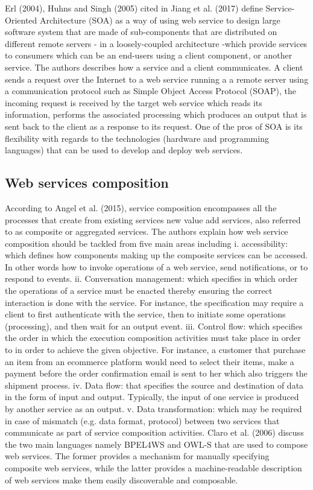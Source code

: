 \documentclass{article}
\begin{document}
Erl (2004), Huhns and Singh (2005) cited in Jiang et al. (2017) define Service-Oriented Architecture (SOA) as a way of using web service to design large software system that are made of sub-components that are distributed on different remote servers -  in a loosely-coupled architecture -which provide services to consumers which can be an end-users using a client component, or another service. The authors describes how a service and a client communicates. A client sends a request over the Internet to a web service running a a remote server using a communication protocol such as Simple Object Access Protocol (SOAP), the incoming request is received by the target web service which reads its information, performs the associated processing which produces an output that is sent back to the client as a response to its request. One of the pros of SOA is its flexibility with regards to the technologies (hardware and programming languages) that can be used to develop and deploy web services.
 
\subsection{Web services composition}
According to Angel et al. (2015), service composition encompasses all the processes that create from existing services new value add services, also referred to as composite or aggregated services. The authors explain how web service composition should be tackled from five main areas including i. accessibility: which defines how components making up the composite services can be accessed. In other words how to invoke operations of a web service, send notifications, or to respond to events. ii. Conversation management: which specifies in which order the operations of a service must be enacted thereby ensuring the correct interaction is done with the service. For instance, the specification may require a client to first authenticate with the service, then to initiate some operations (processing), and then wait for an output event. iii. Control flow: which specifies the order in which the execution composition activities must take place in order to in order to achieve the given objective. For instance, a customer that purchase an item from an ecommerce platform would need to select their items, make a payment before the order confirmation email is sent to her which also triggers the shipment process. iv. Data flow: that specifies the source and destination of data in the form of input and output. Typically, the input of one service is produced by another service as an output. v. Data transformation: which may be required in case of mismatch (e.g. data format, protocol) between two services that communicate as part of service composition activities.
Claro et al. (2006) discuss the two main languages namely BPEL4WS  and  OWL-S that are used to compose web  services. The former provides  a mechanism for manually specifying composite web services, while the latter provides a  machine-readable  description  of  web  services make them easily discoverable  and  composable. 
\end{document}
